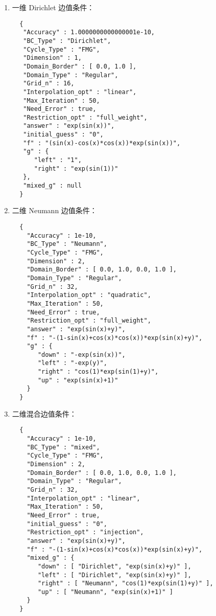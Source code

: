 \documentclass[lang=cn,a4paper,newtx,bibend=bibtex]{elegantpaper}
\begin{document}
\begin{enumerate}
\item 一维 Dirichlet 边值条件：
\begin{lstlisting}
  {
   "Accuracy" : 1.0000000000000001e-10,
   "BC_Type" : "Dirichlet",
   "Cycle_Type" : "FMG",
   "Dimension" : 1,
   "Domain_Border" : [ 0.0, 1.0 ],
   "Domain_Type" : "Regular",
   "Grid_n" : 16,
   "Interpolation_opt" : "linear",
   "Max_Iteration" : 50,
   "Need_Error" : true,
   "Restriction_opt" : "full_weight",
   "answer" : "exp(sin(x))",
   "initial_guess" : "0",
   "f" : "(sin(x)-cos(x)*cos(x))*exp(sin(x))",
   "g" : {
      "left" : "1",
      "right" : "exp(sin(1))"
   },
   "mixed_g" : null
  }
\end{lstlisting}

\item 二维 Neumann 边值条件：
\begin{lstlisting}
  {
    "Accuracy" : 1e-10,
    "BC_Type" : "Neumann",
    "Cycle_Type" : "FMG",
    "Dimension" : 2,
    "Domain_Border" : [ 0.0, 1.0, 0.0, 1.0 ],
    "Domain_Type" : "Regular",
    "Grid_n" : 32,
    "Interpolation_opt" : "quadratic",
    "Max_Iteration" : 50,
    "Need_Error" : true,
    "Restriction_opt" : "full_weight",
    "answer" : "exp(sin(x)+y)",
    "f" : "-(1-sin(x)+cos(x)*cos(x))*exp(sin(x)+y)",
    "g" : {
       "down" : "-exp(sin(x))",
       "left" : "-exp(y)",
       "right" : "cos(1)*exp(sin(1)+y)",
       "up" : "exp(sin(x)+1)"
    }
  }
\end{lstlisting}

\item 二维混合边值条件：
\begin{lstlisting}
  {
    "Accuracy" : 1e-10,
    "BC_Type" : "mixed",
    "Cycle_Type" : "FMG",
    "Dimension" : 2,
    "Domain_Border" : [ 0.0, 1.0, 0.0, 1.0 ],
    "Domain_Type" : "Regular",
    "Grid_n" : 32,
    "Interpolation_opt" : "linear",
    "Max_Iteration" : 50,
    "Need_Error" : true,
    "initial_guess" : "0",
    "Restriction_opt" : "injection",
    "answer" : "exp(sin(x)+y)",
    "f" : "-(1-sin(x)+cos(x)*cos(x))*exp(sin(x)+y)",
    "mixed_g" : {
       "down" : [ "Dirichlet", "exp(sin(x)+y)" ],
       "left" : [ "Dirichlet", "exp(sin(x)+y)" ],
       "right" : [ "Neumann", "cos(1)*exp(sin(1)+y)" ],
       "up" : [ "Neumann", "exp(sin(x)+1)" ]
    }
  }
\end{lstlisting}
\end{enumerate}

~~\\
\end{document}
